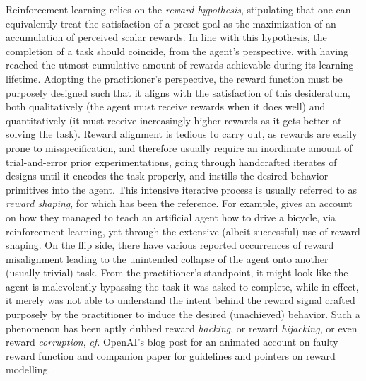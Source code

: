 Reinforcement learning relies on the \emph{reward hypothesis},
stipulating that one can equivalently treat the satisfaction of a preset goal
as the maximization of an accumulation of perceived scalar rewards.
In line with this hypothesis, the completion of a task should coincide, from the agent's perspective,
with having reached the utmost cumulative amount of rewards achievable during its learning lifetime.
Adopting the practitioner's perspective,
the reward function must be purposely designed such that it aligns with the satisfaction of this desideratum,
both qualitatively (the agent must receive rewards when it does well)
and quantitatively (it must receive increasingly higher rewards as it gets better at solving the task).
Reward alignment is tedious to carry out, as rewards are easily prone to misspecification,
and therefore usually require an inordinate amount of trial-and-error prior experimentations,
going through handcrafted iterates of designs until it encodes the task properly, and instills the desired
behavior primitives into the agent.
This intensive iterative process is usually referred to as \textit{reward shaping},
for which \cite{Ng1999-lv} has been the reference.
For example, \cite{Randlov1998-qo} gives an account on how they managed to teach
an artificial agent how to drive a bicycle,
via reinforcement learning, yet through the extensive (albeit successful) use of reward shaping.
On the flip side, there have various reported occurrences of reward misalignment leading to
the unintended collapse of the agent onto another (usually trivial) task.
From the practitioner's standpoint, it might look like the agent is malevolently bypassing the task
it was asked to complete, while in effect, it merely was not able to understand the intent behind the
reward signal crafted purposely by the practitioner to induce the desired (unachieved) behavior.
Such a phenomenon has been aptly dubbed reward \textit{hacking}, or reward \textit{hijacking}, or
even reward \textit{corruption}, \textit{cf.} OpenAI's blog post \cite{Amodei2016-vg}
for an animated account on faulty reward function and companion paper \cite{Amodei2016-tb} for
guidelines and pointers on reward modelling.

